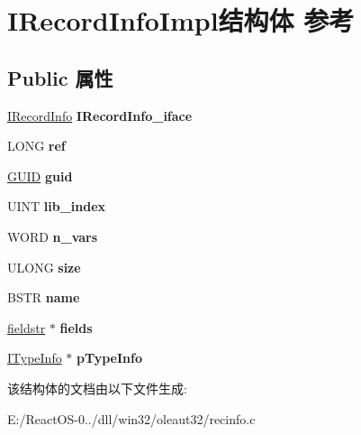 \hypertarget{struct_i_record_info_impl}{}\section{I\+Record\+Info\+Impl结构体 参考}
\label{struct_i_record_info_impl}
\subsection*{Public 属性}
\begin{DoxyCompactItemize}
\item 
\mbox{\label{struct_i_record_info_impl_a07c4bb5e0fa436f02c3f98f1b7b6cea7}} 
\hyperlink{interface_i_record_info}{I\+Record\+Info} {\bfseries I\+Record\+Info\+\_\+iface}
\item 
\mbox{\label{struct_i_record_info_impl_a9b060ce5127f003a8b1ecf5e9467f67e}} 
L\+O\+NG {\bfseries ref}
\item 
\mbox{\label{struct_i_record_info_impl_a8a3d1ac87563bf56d80a2d2806ecf41d}} 
\hyperlink{interface_g_u_i_d}{G\+U\+ID} {\bfseries guid}
\item 
\mbox{\label{struct_i_record_info_impl_a236a071145866daa4e0f6dc351f52fd8}} 
U\+I\+NT {\bfseries lib\+\_\+index}
\item 
\mbox{\label{struct_i_record_info_impl_a7c06337d2924ac22a2dccbbc87bfa84e}} 
W\+O\+RD {\bfseries n\+\_\+vars}
\item 
\mbox{\label{struct_i_record_info_impl_aebcfdb1f01d53ab1727c2cb47d535161}} 
U\+L\+O\+NG {\bfseries size}
\item 
\mbox{\label{struct_i_record_info_impl_af23a376745639f7d6b11edfeb98e9959}} 
B\+S\+TR {\bfseries name}
\item 
\mbox{\label{struct_i_record_info_impl_a20b64ba614b96c7ecee0f33a40e0be5b}} 
\hyperlink{structfieldstr}{fieldstr} $\ast$ {\bfseries fields}
\item 
\mbox{\label{struct_i_record_info_impl_a2a3a56f08858a3ca5b2934dbe3afe7bc}} 
\hyperlink{interface_i_type_info}{I\+Type\+Info} $\ast$ {\bfseries p\+Type\+Info}
\end{DoxyCompactItemize}


该结构体的文档由以下文件生成\+:\begin{DoxyCompactItemize}
\item 
E\+:/\+React\+O\+S-\/0../dll/win32/oleaut32/recinfo.\+c\end{DoxyCompactItemize}
